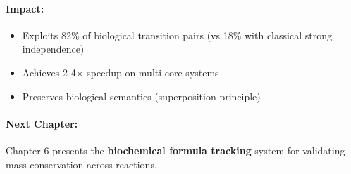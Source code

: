 \paragraph{Impact:}
\begin{itemize}
    \item Exploits 82\% of biological transition pairs (vs 18\% with classical strong independence)
    \item Achieves 2-4$\times$ speedup on multi-core systems
    \item Preserves biological semantics (superposition principle)
\end{itemize}

\paragraph{Next Chapter:} Chapter 6 presents the \textbf{biochemical formula tracking} system for validating mass conservation across reactions.
